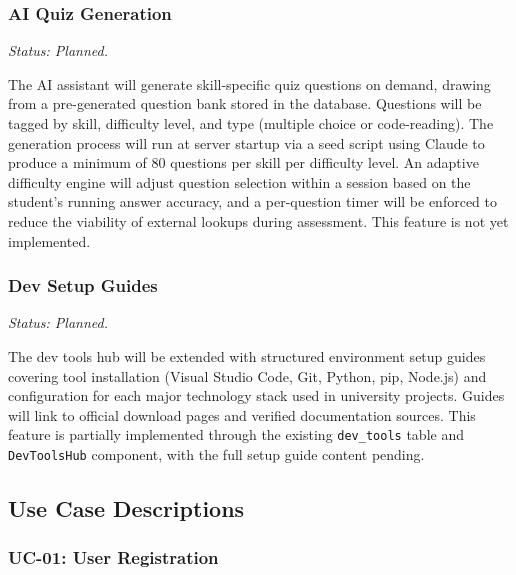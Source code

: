 \documentclass[12pt,a4paper]{article}
\begin{document}
\subsubsection{AI Quiz Generation}

\textit{Status: Planned.}

The AI assistant will generate skill-specific quiz questions on demand, drawing from a
pre-generated question bank stored in the database. Questions will be tagged by skill,
difficulty level, and type (multiple choice or code-reading). The generation process will
run at server startup via a seed script using Claude to produce a minimum of 80 questions
per skill per difficulty level. An adaptive difficulty engine will adjust question
selection within a session based on the student's running answer accuracy, and a
per-question timer will be enforced to reduce the viability of external lookups during
assessment. This feature is not yet implemented.

\subsubsection{Dev Setup Guides}

\textit{Status: Planned.}

The dev tools hub will be extended with structured environment setup guides covering tool
installation (Visual Studio Code, Git, Python, pip, Node.js) and configuration for each
major technology stack used in university projects. Guides will link to official
download pages and verified documentation sources. This feature is partially implemented
through the existing \texttt{dev\_tools} table and \texttt{DevToolsHub} component, with
the full setup guide content pending.

\subsection{Use Case Descriptions}

\subsubsection*{UC-01: User Registration}
\end{document}
